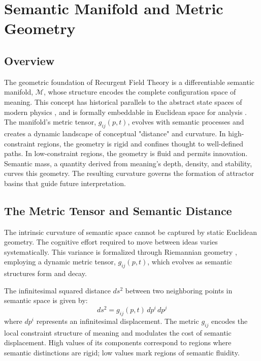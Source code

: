\chapter{Semantic Manifold and Metric Geometry}

\section{Overview}

The geometric foundation of Recurgent Field Theory is a differentiable semantic manifold, \(\mathcal{M}\), whose structure encodes the complete configuration space of meaning. This concept has historical parallels to the abstract state spaces of modern physics \autocite{vonNeumann1932}, and is formally embeddable in Euclidean space for analysis \autocite{Whitney1936}. The manifold's metric tensor, \(g_{ij}(p, t)\), evolves with semantic processes and creates a dynamic landscape of conceptual "distance" and curvature. In high-constraint regions, the geometry is rigid and confines thought to well-defined paths. In low-constraint regions, the geometry is fluid and permits innovation. Semantic mass, a quantity derived from meaning's depth, density, and stability, curves this geometry. The resulting curvature governs the formation of attractor basins that guide future interpretation.

\section{The Metric Tensor and Semantic Distance}

The intrinsic curvature of semantic space cannot be captured by static Euclidean geometry. The cognitive effort required to move between ideas varies systematically. This variance is formalized through Riemannian geometry \autocite{Riemann1868, doCarmo1992}, employing a dynamic metric tensor, \(g_{ij}(p,t)\), which evolves as semantic structures form and decay.

The infinitesimal squared distance \(ds^2\) between two neighboring points in semantic space is given by:
\begin{equation}
ds^2 = g_{ij}(p, t) \, dp^i \, dp^j
\end{equation}
where \(dp^i\) represents an infinitesimal displacement. The metric \(g_{ij}\) encodes the local constraint structure of meaning and modulates the cost of semantic displacement. High values of its components correspond to regions where semantic distinctions are rigid; low values mark regions of semantic fluidity.

